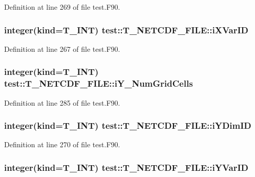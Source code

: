 Definition at line 269 of file test.F90.

\hypertarget{typetest_1_1_t___n_e_t_c_d_f___f_i_l_e_a89c98fa791b25555e37fbfcdc0aee05f}{
\subsubsection[{iXVarID}]{\setlength{\rightskip}{0pt plus 5cm}integer(kind={\bf T\_\-INT}) {\bf test::T\_\-NETCDF\_\-FILE::iXVarID}}}
\label{typetest_1_1_t___n_e_t_c_d_f___f_i_l_e_a89c98fa791b25555e37fbfcdc0aee05f}


Definition at line 267 of file test.F90.

\hypertarget{typetest_1_1_t___n_e_t_c_d_f___f_i_l_e_acf7548b69430f466664da7a8e41b790a}{
\subsubsection[{iY\_\-NumGridCells}]{\setlength{\rightskip}{0pt plus 5cm}integer(kind={\bf T\_\-INT}) {\bf test::T\_\-NETCDF\_\-FILE::iY\_\-NumGridCells}}}
\label{typetest_1_1_t___n_e_t_c_d_f___f_i_l_e_acf7548b69430f466664da7a8e41b790a}


Definition at line 285 of file test.F90.

\hypertarget{typetest_1_1_t___n_e_t_c_d_f___f_i_l_e_a696b8c315c96317dd018e38accddbbf8}{
\subsubsection[{iYDimID}]{\setlength{\rightskip}{0pt plus 5cm}integer(kind={\bf T\_\-INT}) {\bf test::T\_\-NETCDF\_\-FILE::iYDimID}}}
\label{typetest_1_1_t___n_e_t_c_d_f___f_i_l_e_a696b8c315c96317dd018e38accddbbf8}


Definition at line 270 of file test.F90.

\hypertarget{typetest_1_1_t___n_e_t_c_d_f___f_i_l_e_a7172389ea31a6a1e8e6f79027b83d370}{
\subsubsection[{iYVarID}]{\setlength{\rightskip}{0pt plus 5cm}integer(kind={\bf T\_\-INT}) {\bf test::T\_\-NETCDF\_\-FILE::iYVarID}}}
\label{typetest_1_1_t___n_e_t_c_d_f___f_i_l_e_a7172389ea31a6a1e8e6f79027b83d370}


